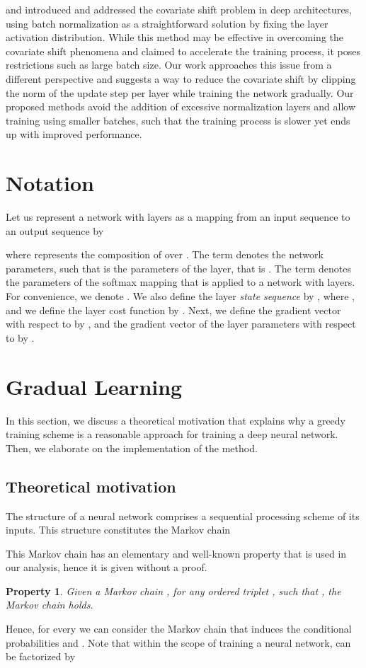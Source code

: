 \documentclass{article}
\newtheorem{property}{Property}
\begin{document}
\citet{IofeSzegedy} and \citet{RNNBatchNorm} introduced and addressed the covariate shift problem in deep architectures, using batch normalization as a straightforward solution by fixing the layer activation distribution. 
While this method may be effective in overcoming the covariate shift phenomena and claimed to accelerate the training process, it poses restrictions such as large batch size. 
Our work approaches this issue from a different perspective and suggests a way to reduce the covariate shift by clipping the norm of the update step per layer while training the network gradually. 
Our proposed methods avoid the addition of excessive normalization layers and allow training using smaller batches, such that the training process is slower yet ends up with improved performance.

\section{Notation}
Let us represent a network with  layers as a mapping from an input sequence  to an output sequence  by 

where  represents the composition of  over . 
The term  denotes the network parameters, such that  is the parameters of the  layer, that is . The term  denotes the parameters of the softmax mapping  that is applied to a network with  layers. 
For convenience, we denote .
We also define the  layer \textit{state sequence} by ,
where , and we define the  layer cost function by .
Next, we define the gradient vector with respect to  by , and the gradient vector of the  layer parameters with respect to  by .


\section{Gradual Learning}
In this section, we discuss a theoretical motivation that explains why a greedy training scheme is a reasonable approach for training  a deep  neural network. 
Then, we elaborate on the implementation of the method.

\subsection{Theoretical motivation}

The structure of a neural network comprises a sequential processing scheme of its inputs. This structure constitutes the Markov chain
 
This Markov chain has an elementary and well-known property that is used in our analysis, hence it is given without a proof.
\begin{property} \label{prop_markov}
Given a Markov chain , for any ordered triplet , such that , the Markov chain  holds.
\end{property}
Hence, for every  we can consider the Markov chain  that induces the conditional probabilities  and . 
Note that within the scope of training a neural network,  can be factorized by
 
\end{document}
